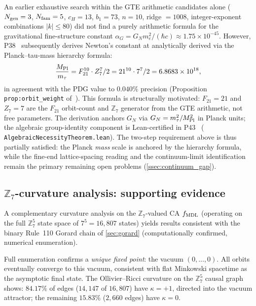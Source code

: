 \documentclass[11pt]{article}
\theoremstyle{remark}
\newcommand{\lean}[1]{%
  \penalty-100
  \begingroup\def\_{\textunderscore\allowbreak}\texttt{#1}\endgroup}
\newcommand{\CatA}{computationally confirmed}
\newcommand{\CatAD}{analytically derived}
\newcommand{\fmdl}{f_{\rm MDL}}
\begin{document}
An earlier exhaustive search within the GTE arithmetic candidates alone
($N_{\rm gen} = 3$, $N_{\rm fam} = 5$, $c_H = 13$,
$b_1 = 73$, $n = 10$, ridge $= 1008$, integer-exponent combinations $|k| \leq 80$)
did not find a purely arithmetic formula for the gravitational
fine-structure constant $\alpha_G = G_N m_e^2 / (\hbar c) \approx 1.75 \times 10^{-45}$.
However, P38~\cite{SpivackPhiMDLGravity} subsequently derives Newton's constant
at \CatAD{} via the Planck--tau-mass hierarchy formula:
\begin{equation}
  \frac{M_{\rm Pl}}{m_\tau} = F_{21}^{10} \cdot Z_7^7 / 2 = 21^{10} \cdot 7^7 / 2
  = 6.8683 \times 10^{18},
\end{equation}
in agreement with the PDG value to $0.040\%$ precision (Proposition
\texttt{prop:orbit\_weight} of~\cite{SpivackPhiMDLGravity}).
This formula is structurally motivated: $F_{21} = 21$ and $Z_7 = 7$ are
the $F_{21}$ orbit-count and $\mathbb{Z}_7$ generator from the GTE arithmetic,
not free parameters.
The derivation anchors $G_N$ via $G_N = m_\tau^2 / M_{\rm Pl}^2$ in Planck units;
the algebraic group-identity component is Lean-certified in
P43~\cite{SpivackCompleteness} (\lean{AlgebraicNecessityTheorem.lean}).
The two-step requirement above is thus partially satisfied: the Planck
\emph{mass} scale is anchored by the hierarchy formula, while the fine-end
lattice-spacing reading and the continuum-limit identification remain the
primary remaining open problems (\cref{ssec:continuum_gap}).

\subsection{\texorpdfstring{$\mathbb{Z}_7$}{Z7}-curvature analysis: supporting evidence}
\label{ssec:z7_ricci}

A complementary curvature analysis on the $\mathbb{Z}_7$-valued CA
$\fmdl$ (operating on the full $\mathbb{Z}_7^5$ state space of
$7^5 = 16{,}807$ states) yields results consistent with the binary
Rule~110 Gorard chain of \cref{sec:gorard} (\CatA, numerical enumeration).

Full enumeration confirms a \emph{unique fixed point}: the vacuum
$(0, \ldots, 0)$.
All orbits eventually converge to this vacuum, consistent with flat
Minkowski spacetime as the asymptotic final state.
The Ollivier--Ricci curvature on the $\mathbb{Z}_7^5$ causal graph shows:
$84.17\%$ of edges ($14{,}147$ of $16{,}807$) have $\kappa = +1$, directed
into the vacuum attractor; the remaining $15.83\%$ ($2{,}660$ edges) have
$\kappa = 0$.
\end{document}
